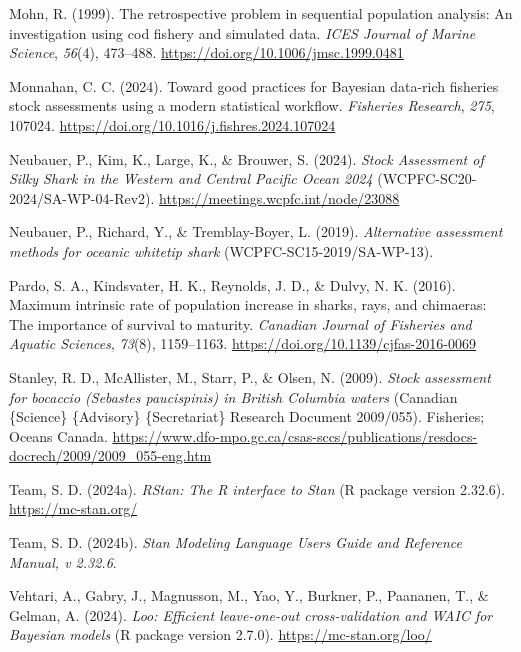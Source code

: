 \documentclass[
  11pt,
]{SCreport}
\newlength{\cslhangindent}
\newenvironment{CSLReferences}[2] %
 {\begin{list}{}{%
  \setlength{\itemindent}{0pt}
  \setlength{\leftmargin}{0pt}
  \setlength{\parsep}{0pt}
  \ifodd #1
   \setlength{\leftmargin}{\cslhangindent}
   \setlength{\itemindent}{-1\cslhangindent}
  \fi
  \setlength{\itemsep}{#2\baselineskip}}}
 {\end{list}}
\begin{document}
\begin{CSLReferences}{1}{0}
Mohn, R. (1999). The retrospective problem in sequential population
analysis: {An} investigation using cod fishery and simulated data.
\emph{ICES Journal of Marine Science}, \emph{56}(4), 473--488.
\url{https://doi.org/10.1006/jmsc.1999.0481}

Monnahan, C. C. (2024). Toward good practices for {Bayesian} data-rich
fisheries stock assessments using a modern statistical workflow.
\emph{Fisheries Research}, \emph{275}, 107024.
\url{https://doi.org/10.1016/j.fishres.2024.107024}

Neubauer, P., Kim, K., Large, K., \& Brouwer, S. (2024). \emph{Stock
{Assessment} of {Silky} {Shark} in the {Western} and {Central} {Pacific}
{Ocean} 2024} (WCPFC-SC20-2024/SA-WP-04-Rev2).
\url{https://meetings.wcpfc.int/node/23088}

Neubauer, P., Richard, Y., \& Tremblay-Boyer, L. (2019).
\emph{Alternative assessment methods for oceanic whitetip shark}
(WCPFC-SC15-2019/SA-WP-13).

Pardo, S. A., Kindsvater, H. K., Reynolds, J. D., \& Dulvy, N. K.
(2016). Maximum intrinsic rate of population increase in sharks, rays,
and chimaeras: The importance of survival to maturity. \emph{Canadian
Journal of Fisheries and Aquatic Sciences}, \emph{73}(8), 1159--1163.
\url{https://doi.org/10.1139/cjfas-2016-0069}

Stanley, R. D., McAllister, M., Starr, P., \& Olsen, N. (2009).
\emph{Stock assessment for bocaccio (\emph{{Sebastes} paucispinis}) in
{British} {Columbia} waters} (Canadian \{Science\} \{Advisory\}
\{Secretariat\} Research Document 2009/055). Fisheries; Oceans Canada.
\url{https://www.dfo-mpo.gc.ca/csas-sccs/publications/resdocs-docrech/2009/2009_055-eng.htm}

Team, S. D. (2024a). \emph{{RStan}: The {R} interface to {Stan}} (R
package version 2.32.6). \url{https://mc-stan.org/}

Team, S. D. (2024b). \emph{Stan {Modeling} {Language} {Users} {Guide}
and {Reference} {Manual}, v 2.32.6}.

Vehtari, A., Gabry, J., Magnusson, M., Yao, Y., Burkner, P., Paananen,
T., \& Gelman, A. (2024). \emph{Loo: {Efficient} leave-one-out
cross-validation and {WAIC} for {Bayesian} models} (R package version
2.7.0). \url{https://mc-stan.org/loo/}


\end{CSLReferences}
\end{document}
